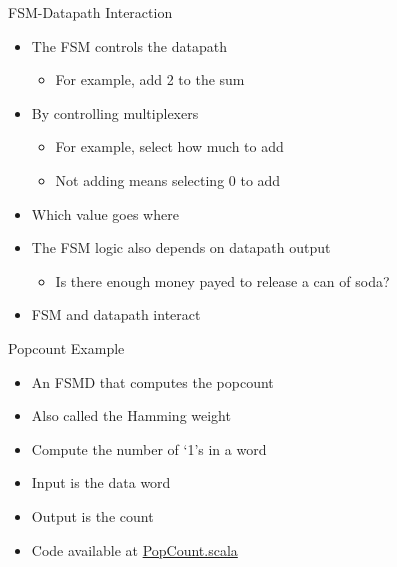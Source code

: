 \begin{frame}[fragile]{FSM-Datapath Interaction}
\begin{itemize}
\item The FSM controls the datapath
\begin{itemize}
\item For example, add 2 to the sum
\end{itemize}
\item By controlling multiplexers
\begin{itemize}
\item For example, select how much to add
\item Not adding means selecting 0 to add
\end{itemize}
\item Which value goes where
\item The FSM logic also depends on datapath output
\begin{itemize}
\item Is there enough money payed to release a can of soda?
\end{itemize}
\item FSM and datapath interact
\end{itemize}
\end{frame}


\begin{frame}[fragile]{Popcount Example}
\begin{itemize}
\item An FSMD that computes the popcount
\item Also called the Hamming weight
\item Compute the number of `1's in a word
\item Input is the data word
\item Output is the count
\item Code available at \href{https://github.com/schoeberl/chisel-book/blob/master/src/main/scala/PopCount.scala}{PopCount.scala}
\end{itemize}
\end{frame}

